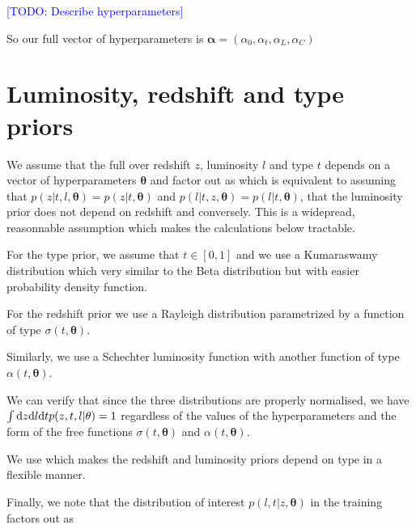 \documentclass[aps,prd,showpacs,superscriptaddress,groupedaddress]{revtex4}  %
\newcommand{\todo}[1]{\textcolor{blue}{[TODO: #1]}}
\begin{document}
\todo{Describe hyperparameters}

So our full vector of hyperparameters is $\bm{\alpha} = (\alpha_0, \alpha_t, \alpha_L, \alpha_C)$

\section{Luminosity, redshift and type priors}

We assume that the full over redshift $z$, luminosity $l$ and type $t$ depends on a vector of hyperparameters $\bm{\theta}$ and   factor out as
which is equivalent to assuming that $p(z | t, l, \bm{\theta}) = p(z | t, \bm{\theta})$ and $p(l | t, z, \bm{\theta})=p(l | t, \bm{\theta})$, \ie that the luminosity prior does not depend on redshift and conversely. 
This is a widepread, reasonnable assumption which makes the calculations below tractable.

For the type prior, we assume that $t\in[0,1]$ and we use a Kumaraswamy distribution
which very similar to the Beta distribution but with easier probability density function.

For the redshift prior we use a Rayleigh distribution
parametrized by a function of type $\sigma(t,\bm{\theta})$.

Similarly, we use a Schechter luminosity function
with another function of type $\alpha(t,\bm{\theta})$.

We can verify that since the three distributions are properly normalised, we have $\int\d z\d l \d t p(z,t,l | \vec{\theta}) = 1$ regardless of the values of the hyperparameters and the form of the free functions $\sigma(t,\bm{\theta})$ and $\alpha(t,\bm{\theta})$.

We use 
which makes the redshift and luminosity priors depend on type in a flexible manner.

Finally, we note that the distribution of interest $p(l,t|z,\bm{\theta})$ in the training factors out as
 
\end{document}
